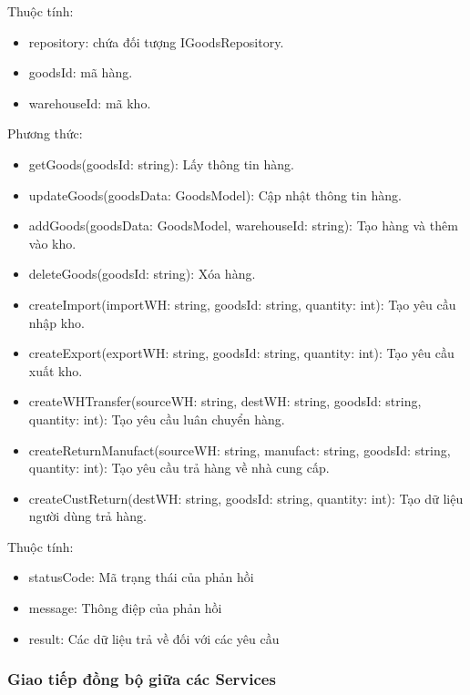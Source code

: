Thuộc tính:
\begin{itemize}
	\item repository: chứa đối tượng IGoodsRepository.
	\item goodsId: mã hàng.
	\item warehouseId: mã kho.
\end{itemize}
Phương thức:
\begin{itemize}
	\item getGoods(goodsId: string): Lấy thông tin hàng.
	\item updateGoods(goodsData: GoodsModel): Cập nhật thông tin hàng.
	\item addGoods(goodsData: GoodsModel, warehouseId: string): Tạo hàng và thêm vào kho.
	\item deleteGoods(goodsId: string): Xóa hàng.
	\item createImport(importWH: string, goodsId: string, quantity: int): Tạo yêu cầu nhập kho.
	\item createExport(exportWH: string, goodsId: string, quantity: int): Tạo yêu cầu xuất kho.
	\item createWHTransfer(sourceWH: string, destWH: string, goodsId: string, quantity: int): Tạo yêu cầu luân chuyển hàng.
	\item createReturnManufact(sourceWH: string, manufact: string, goodsId: string, quantity: int): Tạo yêu cầu trả hàng về nhà cung cấp.
	\item createCustReturn(destWH: string, goodsId: string, quantity: int): Tạo dữ liệu người dùng trả hàng.
\end{itemize}

Thuộc tính:
\begin{itemize}
	\item statusCode: Mã trạng thái của phản hồi
	\item message: Thông điệp của phản hồi
	\item result: Các dữ liệu trả về đối với các yêu cầu
\end{itemize}


\newpage
\subsubsection{Giao tiếp đồng bộ giữa các Services}

